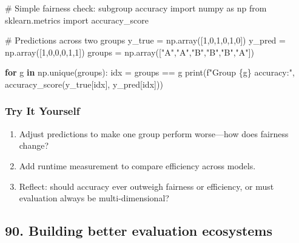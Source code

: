 \documentclass[
  letterpaper,
  DIV=11,
  numbers=noendperiod]{scrreprt}
\newenvironment{Shaded}{\begin{snugshade}}{\end{snugshade}}
\newcommand{\BuiltInTok}[1]{\textcolor[rgb]{0.00,0.23,0.31}{#1}}
\newcommand{\CommentTok}[1]{\textcolor[rgb]{0.37,0.37,0.37}{#1}}
\newcommand{\ControlFlowTok}[1]{\textcolor[rgb]{0.00,0.23,0.31}{\textbf{#1}}}
\newcommand{\DecValTok}[1]{\textcolor[rgb]{0.68,0.00,0.00}{#1}}
\newcommand{\ImportTok}[1]{\textcolor[rgb]{0.00,0.46,0.62}{#1}}
\newcommand{\KeywordTok}[1]{\textcolor[rgb]{0.00,0.23,0.31}{\textbf{#1}}}
\newcommand{\NormalTok}[1]{\textcolor[rgb]{0.00,0.23,0.31}{#1}}
\newcommand{\OperatorTok}[1]{\textcolor[rgb]{0.37,0.37,0.37}{#1}}
\newcommand{\SpecialCharTok}[1]{\textcolor[rgb]{0.37,0.37,0.37}{#1}}
\newcommand{\SpecialStringTok}[1]{\textcolor[rgb]{0.13,0.47,0.30}{#1}}
\newcommand{\StringTok}[1]{\textcolor[rgb]{0.13,0.47,0.30}{#1}}
\providecommand{\tightlist}{%
  \setlength{\itemsep}{0pt}\setlength{\parskip}{0pt}}
\begin{document}
\begin{Shaded}
\begin{Highlighting}[]
\CommentTok{\# Simple fairness check: subgroup accuracy}
\ImportTok{import}\NormalTok{ numpy }\ImportTok{as}\NormalTok{ np}
\ImportTok{from}\NormalTok{ sklearn.metrics }\ImportTok{import}\NormalTok{ accuracy\_score}

\CommentTok{\# Predictions across two groups}
\NormalTok{y\_true }\OperatorTok{=}\NormalTok{ np.array([}\DecValTok{1}\NormalTok{,}\DecValTok{0}\NormalTok{,}\DecValTok{1}\NormalTok{,}\DecValTok{0}\NormalTok{,}\DecValTok{1}\NormalTok{,}\DecValTok{0}\NormalTok{])}
\NormalTok{y\_pred }\OperatorTok{=}\NormalTok{ np.array([}\DecValTok{1}\NormalTok{,}\DecValTok{0}\NormalTok{,}\DecValTok{0}\NormalTok{,}\DecValTok{0}\NormalTok{,}\DecValTok{1}\NormalTok{,}\DecValTok{1}\NormalTok{])}
\NormalTok{groups }\OperatorTok{=}\NormalTok{ np.array([}\StringTok{"A"}\NormalTok{,}\StringTok{"A"}\NormalTok{,}\StringTok{"B"}\NormalTok{,}\StringTok{"B"}\NormalTok{,}\StringTok{"B"}\NormalTok{,}\StringTok{"A"}\NormalTok{])}

\ControlFlowTok{for}\NormalTok{ g }\KeywordTok{in}\NormalTok{ np.unique(groups):}
\NormalTok{    idx }\OperatorTok{=}\NormalTok{ groups }\OperatorTok{==}\NormalTok{ g}
    \BuiltInTok{print}\NormalTok{(}\SpecialStringTok{f"Group }\SpecialCharTok{\{}\NormalTok{g}\SpecialCharTok{\}}\SpecialStringTok{ accuracy:"}\NormalTok{, accuracy\_score(y\_true[idx], y\_pred[idx]))}
\end{Highlighting}
\end{Shaded}

\subsubsection{Try It Yourself}\label{try-it-yourself-88}

\begin{enumerate}
\def\labelenumi{\arabic{enumi}.}
\tightlist
\item
  Adjust predictions to make one group perform worse---how does fairness
  change?
\item
  Add runtime measurement to compare efficiency across models.
\item
  Reflect: should accuracy ever outweigh fairness or efficiency, or must
  evaluation always be multi-dimensional?
\end{enumerate}

\subsection{90. Building better evaluation
ecosystems}\label{building-better-evaluation-ecosystems}
\end{document}
